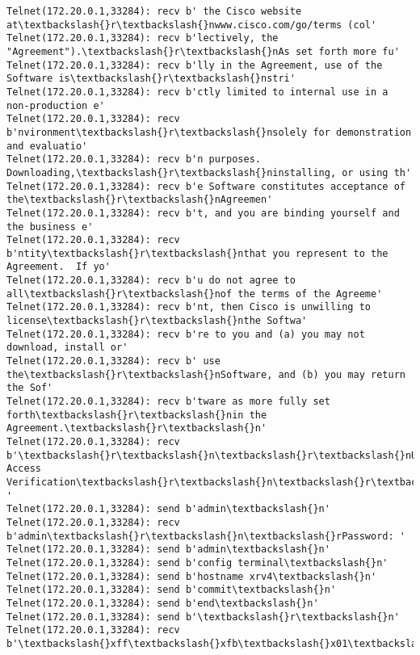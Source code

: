 \documentclass[11pt]{article}
\begin{document}
\begin{Verbatim}[commandchars=\\\{\}]
Telnet(172.20.0.1,33284): recv b' the Cisco website at\textbackslash{}r\textbackslash{}nwww.cisco.com/go/terms (col'
Telnet(172.20.0.1,33284): recv b'lectively, the "Agreement").\textbackslash{}r\textbackslash{}nAs set forth more fu'
Telnet(172.20.0.1,33284): recv b'lly in the Agreement, use of the Software is\textbackslash{}r\textbackslash{}nstri'
Telnet(172.20.0.1,33284): recv b'ctly limited to internal use in a non-production e'
Telnet(172.20.0.1,33284): recv b'nvironment\textbackslash{}r\textbackslash{}nsolely for demonstration and evaluatio'
Telnet(172.20.0.1,33284): recv b'n purposes.  Downloading,\textbackslash{}r\textbackslash{}ninstalling, or using th'
Telnet(172.20.0.1,33284): recv b'e Software constitutes acceptance of the\textbackslash{}r\textbackslash{}nAgreemen'
Telnet(172.20.0.1,33284): recv b't, and you are binding yourself and the business e'
Telnet(172.20.0.1,33284): recv b'ntity\textbackslash{}r\textbackslash{}nthat you represent to the Agreement.  If yo'
Telnet(172.20.0.1,33284): recv b'u do not agree to all\textbackslash{}r\textbackslash{}nof the terms of the Agreeme'
Telnet(172.20.0.1,33284): recv b'nt, then Cisco is unwilling to license\textbackslash{}r\textbackslash{}nthe Softwa'
Telnet(172.20.0.1,33284): recv b're to you and (a) you may not download, install or'
Telnet(172.20.0.1,33284): recv b' use the\textbackslash{}r\textbackslash{}nSoftware, and (b) you may return the Sof'
Telnet(172.20.0.1,33284): recv b'tware as more fully set forth\textbackslash{}r\textbackslash{}nin the Agreement.\textbackslash{}r\textbackslash{}n'
Telnet(172.20.0.1,33284): recv b'\textbackslash{}r\textbackslash{}n\textbackslash{}r\textbackslash{}nUser Access Verification\textbackslash{}r\textbackslash{}n\textbackslash{}r\textbackslash{}nUsername: '
Telnet(172.20.0.1,33284): send b'admin\textbackslash{}n'
Telnet(172.20.0.1,33284): recv b'admin\textbackslash{}r\textbackslash{}n\textbackslash{}rPassword: '
Telnet(172.20.0.1,33284): send b'admin\textbackslash{}n'
Telnet(172.20.0.1,33284): send b'config terminal\textbackslash{}n'
Telnet(172.20.0.1,33284): send b'hostname xrv4\textbackslash{}n'
Telnet(172.20.0.1,33284): send b'commit\textbackslash{}n'
Telnet(172.20.0.1,33284): send b'end\textbackslash{}n'
Telnet(172.20.0.1,33284): send b'\textbackslash{}r\textbackslash{}n'
Telnet(172.20.0.1,33284): recv b'\textbackslash{}xff\textbackslash{}xfb\textbackslash{}x01\textbackslash{}xff\textbackslash{}xfb\textbackslash{}x03\textbackslash{}xff\textbackslash{}xfb\textbackslash{}x00\textbackslash{}xff\textbackslash{}xfd\textbackslash{}x00\textbackslash{}x1b]0;xrv4\textbackslash{}x07\textbackslash{}r\textbackslash{}n\textbackslash{}rRP/0/0/CPU0:xrv4\#\textbackslash{}r\textbackslash{}n\textbackslash{}rRP/0/0'

\end{Verbatim}
\end{document}
